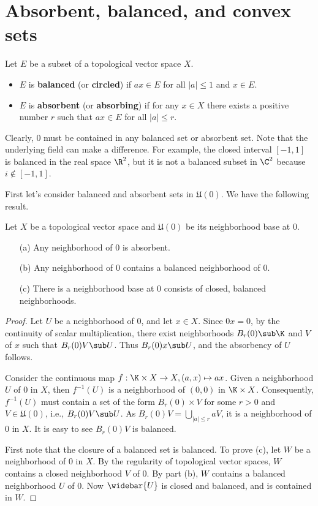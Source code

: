\section{Absorbent, balanced, and convex sets}
\begin{definition}
Let $E$ be a subset of a topological vector space $X$.
\begin{itemize}
\item $E$ is \textbf{balanced} (or \textbf{circled}) if $ax\in E$ for all $|a|\leq 1$ and $x\in E$.
\item $E$ is \textbf{absorbent} (or \textbf{absorbing}) if for any $x\in X$ there exists a positive number $r$ such that $a x\in E$ for all $|a|\leq r$.
\end{itemize}
\end{definition}
Clearly, $0$ must be contained in any balanced set or absorbent set. Note that the underlying field can make a difference. For example, the closed interval $[-1,1]$ is balanced in the real space $\R^2$, but it is not a balanced subset in $\C^2$ because $i\notin[-1,1]$.\par
First let's consider balanced and absorbent sets in $\mathfrak{U}(0)$. We have the following result.
\begin{proposition}\label{TVS nhbd base of 0 balanced and absorbent}
Let $X$ be a topological vector space and $\mathfrak{U}(0)$ be its neighborhood base at $0$.
\begin{itemize}
\item[(a)] Any neighborhood of $0$ is absorbent.
\item[(b)] Any neighborhood of $0$ contains a balanced neighborhood of $0$.
\item[(c)] There is a neighborhood base at $0$ consists of closed, balanced neighborhoods.
\end{itemize}
\end{proposition}
\begin{proof}
Let $U$ be a neighborhood of $0$, and let $x\in X$. Since $0x=0$, by the continuity of scalar multiplication, there exist neighborhoods $B_r(0)\sub\K$ and $V$ of $x$ such that $B_r(0)V\sub U$. Thus $B_r(0)x\sub U$, and the absorbency of $U$ follows.\par
Consider the continuous map $f:\K\times X\to X,(a,x)\mapsto ax$. Given a neighborhood $U$ of $0$ in $X$, then $f^{-1}(U)$ is a neighborhood of $(0,0)$ in $\K\times X$. Consequently, $f^{-1}(U)$ must contain a set of the form $B_r(0)\times V$ for some $r>0$ and $V\in\mathfrak{U}(0)$, i.e., $B_r(0)V\sub U$. As $B_r(0)V=\bigcup_{|a|\leq r}aV$, it is a neighborhood of $0$ in $X$. It is easy to see $B_r(0)V$ is balanced.\par
First note that the closure of a balanced set is balanced. To prove (c), let $W$ be a neighborhood of $0$ in $X$. By the regularity of topological vector spaces, $W$ contains a closed neighborhood $V$ of $0$. By part (b), $W$ contains a balanced neighborhood $U$ of $0$. Now $\widebar{U}$ is closed and balanced, and is contained in $W$.
\end{proof}

